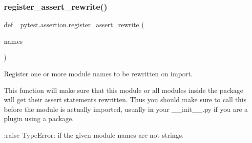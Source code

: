 \subsubsection{\texorpdfstring{register\+\_\+assert\+\_\+rewrite()}{register\_assert\_rewrite()}}
{\footnotesize\ttfamily def \+\_\+pytest.\+assertion.\+register\+\_\+assert\+\_\+rewrite (\begin{DoxyParamCaption}\item[{}]{names }\end{DoxyParamCaption})}

\begin{DoxyVerb}Register one or more module names to be rewritten on import.

This function will make sure that this module or all modules inside
the package will get their assert statements rewritten.
Thus you should make sure to call this before the module is
actually imported, usually in your __init__.py if you are a plugin
using a package.

:raise TypeError: if the given module names are not strings.
\end{DoxyVerb}
 